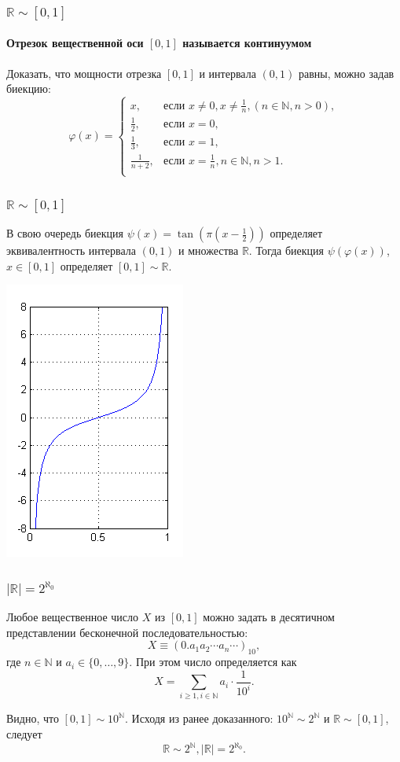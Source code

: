 \begin{frame}
    \frametitle{$\mathbb{R}\sim [0,1]$}
    \framesubtitle{Отрезок вещественной оси $[0,1]$ называется континуумом}
    
    Доказать, что мощности отрезка $[0,1]$ и интервала $(0,1)$ равны, можно задав биекцию:
    \[
        \varphi(x)=
        \begin{cases}
            x,&\text{если $x\neq 0,x\neq\frac{1}{n},(n\in\mathbb{N},n>0)$},\\
            \frac{1}{2},&\text{если $x=0$},\\
            \frac{1}{3},&\text{если $x=1$},\\
            \frac{1}{n+2},&\text{если $x=\frac{1}{n},n\in\mathbb{N},n>1$}.\\
        \end{cases}
    \]
\end{frame}

\begin{frame}
    \frametitle{$\mathbb{R}\sim [0,1]$}
    
    В свою очередь биекция $\psi(x)=\tan(\pi(x-\frac{1}{2}))$ определяет эквивалентность интервала $(0,1)$ и множества $\mathbb{R}$. Тогда биекция $\psi(\varphi(x))$, $x\in[0,1]$ определяет $[0,1]\sim\mathbb{R}$.
    \begin{center}
        \includegraphics[height=.6\textheight]{fig/tanx}
    \end{center}
\end{frame}

\begin{frame}
    \frametitle{$|\mathbb{R}|=2^{\aleph_0}$}
    
    Любое вещественное число $X$ из $[0,1]$ можно задать в десятичном представлении бесконечной последовательностью:
    \[
        X\equiv(0.a_1a_2\cdots a_n\cdots)_{10},
    \]
    где $n\in\mathbb{N}$ и $a_i\in\{0,\ldots,9\}$. При этом число определяется как
    \[
        X=\sum_{i\geq 1,i\in\mathbb{N}}a_i\cdot \frac{1}{10^i}.
    \]
    
    Видно, что $[0,1]\sim 10^\mathbb{N}$. Исходя из ранее доказанного: $10^\mathbb{N}\sim 2^\mathbb{N}$ и $\mathbb{R}\sim[0,1]$, следует 
    \[
        \mathbb{R}\sim 2^\mathbb{N},
        |\mathbb{R}|=2^{\aleph_0}.
    \]
\end{frame}


